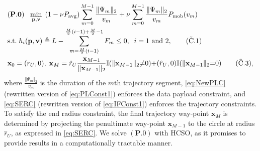 \documentclass[12pt, draftcls, onecolumn]{IEEEtran}
\theoremstyle{plain}
\theoremstyle{definition}
\theoremstyle{remark}
\begin{document}
\begin{align}
    &(\mathbf{P.0})\;\;\; \underset{\mathbf p,\mathbf v}{\mathrm{min}} \;\,  (1-\nu P_{\mathrm{avg}}) \sum_{m=0}^{M-1} \frac{\Vert \Psi_m \Vert_2}{v_m} + \nu \sum_{m=0}^{M-1} \frac{\Vert \Psi_m \Vert_2}{v_m} P_{\mathrm{mob}}(v_m) \label{eq:HeurMin}\\
    &\mathrm{s.t.}\; h_{i}(\mathbf p ,\mathbf v) \triangleq L - \sum_{m=\frac{M}{2}(i-1)}^{\frac{M}{2}(i-1)+\frac{M}{2}-1} F_{m} \leq 0, \;\; i = 1\text{ and }2,\label{eq:NewPLC}\tag{$\tilde{\text{C}}$.1} \\
    &\mathbf x_0 = (r_U,0), \; \mathbf x_M = 
    \hat{r}_U\frac{\mathbf{x}_{M-1}}{\Vert \mathbf x_{M-1}\Vert_2}\mathbb{I}(\Vert \mathbf x_{M-1} \Vert_2 {\neq} 0) {+} (\hat{r}_U,0)\mathbb{I}(\Vert \mathbf x_{M-1} \Vert_2 {=} 0)\label{eq:SERC}\tag{$\tilde{\text{C}}$.3},
\end{align}
where
$\frac{\Vert\Psi_{m}\Vert_{2}}{v_{m}}$ is the duration of the $m$th trajectory segment,
\ref{eq:NewPLC} (rewritten version of \ref{eq:PLConst1}) enforces the data payload constraint, and \ref{eq:SERC} (rewritten version of \ref{eq:IFConst1}) enforces the trajectory constraints. To satisfy the end radius constraint, the final trajectory way-point $\mathbf{x}_{M}$ is determined by projecting the penultimate way-point $\mathbf{x}_{M{-}1}$ to the circle at radius $\hat{r}_{U}$, as expressed in \ref{eq:SERC}. We solve $(\mathbf{P.0})$ with HCSO, as it promises to provide results in a computationally tractable manner. 
\end{document}
